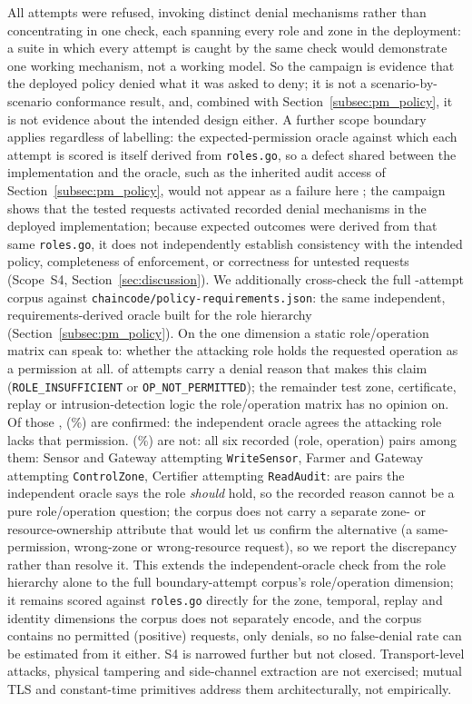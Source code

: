 \documentclass[a4paper,fleqn]{cas-sc}
\begin{document}
All \SecAttempts{} attempts were refused, invoking \SecDistinctReasons{}
distinct denial mechanisms rather than concentrating in one check, each
spanning every role and zone in the deployment: a suite in which every
attempt is caught by the same check would demonstrate one working
mechanism, not a working model. So the campaign is evidence that the
deployed policy denied what it was asked to deny; it is not a
scenario-by-scenario conformance result, and, combined with
Section~\ref{subsec:pm_policy}, it is not evidence about the intended
design either. A further scope boundary applies regardless of labelling: the
expected-permission oracle against which each attempt is scored is itself
derived from \texttt{roles.go}, so a defect shared between the
implementation and the oracle, such as the inherited audit access of
Section~\ref{subsec:pm_policy}, would not appear as a failure here ; the
campaign shows that the tested requests activated \SecDistinctReasons{}
recorded denial mechanisms in the deployed implementation; because
expected outcomes were derived from that same \texttt{roles.go}, it does
not independently establish consistency with the intended policy,
completeness of enforcement, or correctness for untested requests
(Scope~S4, Section~\ref{sec:discussion}). We additionally cross-check
the full \SecAttempts{}-attempt corpus against
\texttt{chaincode/policy-requirements.json}: the same independent,
requirements-derived oracle built for the role hierarchy
(Section~\ref{subsec:pm_policy}). On the one dimension a static
role/operation matrix can speak to: whether the attacking role holds the
requested operation as a permission at all. \SecOracleInScope{} of
\SecAttempts{} attempts carry a denial reason that makes this claim
(\texttt{ROLE\_INSUFFICIENT} or \texttt{OP\_NOT\_PERMITTED}); the
remainder test zone, certificate, replay or intrusion-detection logic the
role/operation matrix has no opinion on. Of those \SecOracleInScope{},
\SecOracleConsistent{} (\SecOracleConsistentPct\%) are confirmed: the
independent oracle agrees the attacking role lacks that permission.
\SecOracleDiscrepant{} (\SecOracleDiscrepantPct\%) are not: all six
recorded (role, operation) pairs among them: Sensor and Gateway
attempting \texttt{WriteSensor}, Farmer and Gateway attempting
\texttt{ControlZone}, Certifier attempting \texttt{ReadAudit}: are
pairs the independent oracle says the role \emph{should} hold, so the
recorded reason cannot be a pure role/operation question; the corpus does
not carry a separate zone- or resource-ownership attribute that would let
us confirm the alternative (a same-permission, wrong-zone or
wrong-resource request), so we report the discrepancy rather than resolve
it. This extends the independent-oracle check from the role hierarchy
alone to the full boundary-attempt corpus's role/operation dimension; it
remains scored against \texttt{roles.go} directly for the zone, temporal,
replay and identity dimensions the corpus does not separately encode, and
the corpus contains no permitted (positive) requests, only denials, so no
false-denial rate can be estimated from it either. S4 is narrowed
further but not closed. Transport-level attacks,
physical tampering and side-channel extraction are not exercised; mutual
TLS and constant-time primitives address them architecturally, not
empirically.
\end{document}
